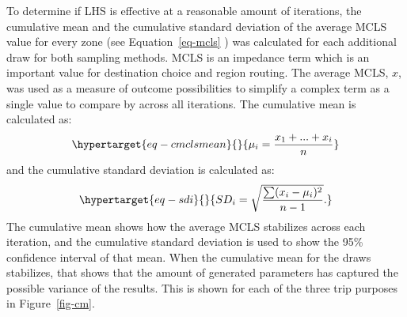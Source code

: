 \documentclass[
  letterpaper,
]{trb}
\begin{document}
To determine if LHS is effective at a reasonable amount of iterations,
the cumulative mean and the cumulative standard deviation of the average
MCLS value for every zone (see Equation~\ref{eq-mcls} ) was calculated
for each additional draw for both sampling methods. MCLS is an impedance
term which is an important value for destination choice and region
routing. The average MCLS, \(x\), was used as a measure of outcome
possibilities to simplify a complex term as a single value to compare by
across all iterations. The cumulative mean is calculated as:
\begin{equation}\protect\hypertarget{eq-cmclsmean}{}{
\mu_i = \frac{x_1 + ... + x_i}{n}
}\label{eq-cmclsmean}\end{equation} and the cumulative standard
deviation is calculated as:
\begin{equation}\protect\hypertarget{eq-sdi}{}{
SD_i = \sqrt{\frac{\sum (x_i - \mu_i)^2 }{n-1}}.
}\label{eq-sdi}\end{equation} The cumulative mean shows how the average
MCLS stabilizes across each iteration, and the cumulative standard
deviation is used to show the 95\% confidence interval of that mean.
When the cumulative mean for the draws stabilizes, that shows that the
amount of generated parameters has captured the possible variance of the
results. This is shown for each of the three trip purposes in
Figure~\ref{fig-cm}.
\end{document}
